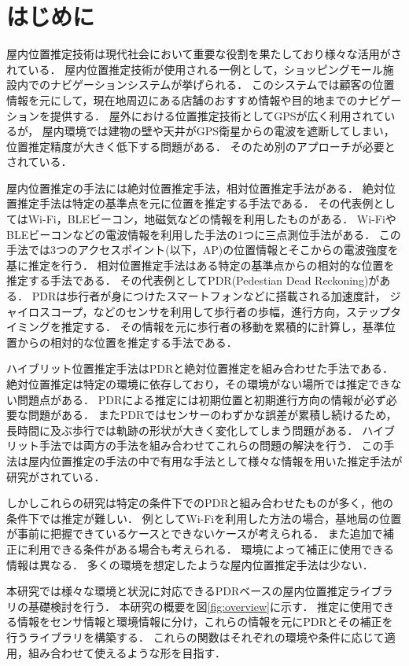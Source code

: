 
\section{はじめに}
屋内位置推定技術は現代社会において重要な役割を果たしており様々な活用がされている．
屋内位置推定技術が使用される一例として，ショッピングモール施設内でのナビゲーションシステムが挙げられる\cite{burasapo}．
このシステムでは顧客の位置情報を元にして，現在地周辺にある店舗のおすすめ情報や目的地までのナビゲーションを提供する．
屋外における位置推定技術としてGPSが広く利用されているが，
屋内環境では建物の壁や天井がGPS衛星からの電波を遮断してしまい，
位置推定精度が大きく低下する問題がある．
そのため別のアプローチが必要とされている．

屋内位置推定の手法には絶対位置推定手法，相対位置推定手法がある．
絶対位置推定手法は特定の基準点を元に位置を推定する手法である．
その代表例としてはWi-Fi，BLEビーコン，地磁気などの情報を利用したものがある．
Wi-FiやBLEビーコンなどの電波情報を利用した手法の1つに三点測位手法がある．
この手法では3つのアクセスポイント(以下，AP)の位置情報とそこからの電波強度を基に推定を行う．
相対位置推定手法はある特定の基準点からの相対的な位置を推定する手法である．
その代表例としてPDR(Pedestian Dead Reckoning)がある．
PDRは歩行者が身につけたスマートフォンなどに搭載される加速度計，
ジャイロスコープ，などのセンサを利用して歩行者の歩幅，進行方向，ステップタイミングを推定する．
その情報を元に歩行者の移動を累積的に計算し，基準位置からの相対的な位置を推定する手法である．

ハイブリット位置推定手法はPDRと絶対位置推定を組み合わせた手法である．
絶対位置推定は特定の環境に依存しており，その環境がない場所では推定できない問題点がある．
PDRによる推定には初期位置と初期進行方向の情報が必ず必要な問題がある．
またPDRではセンサーのわずかな誤差が累積し続けるため，長時間に及ぶ歩行では軌跡の形状が大きく変化してしまう問題がある．
ハイブリット手法では両方の手法を組み合わせてこれらの問題の解決を行う．
この手法は屋内位置推定の手法の中で有用な手法として様々な情報を用いた推定手法が研究がされている．

しかしこれらの研究は特定の条件下でのPDRと組み合わせたものが多く，他の条件下では推定が難しい．
例としてWi-Fiを利用した方法の場合，基地局の位置が事前に把握できているケースとできないケースが考えられる．
また追加で補正に利用できる条件がある場合も考えられる．
環境によって補正に使用できる情報は異なる．
多くの環境を想定したような屋内位置推定手法は少ない．

本研究では様々な環境と状況に対応できるPDRベースの屋内位置推定ライブラリの基礎検討を行う．
本研究の概要を図\ref{fig:overview}に示す．
推定に使用できる情報をセンサ情報と環境情報に分け，これらの情報を元にPDRとその補正を行うライブラリを構築する．
これらの関数はそれぞれの環境や条件に応じて適用，組み合わせて使えるような形を目指す．

